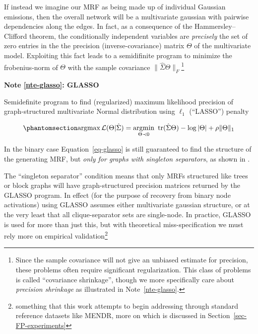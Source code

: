 \documentclass[%
	12pt,
		oneside,
		letterpaper
]{book}
\newcounter{quartocalloutnteno}
\newcommand{\quartocalloutnte}[1]{\refstepcounter{quartocalloutnteno}\label{#1}}
\begin{document}
If instead we imagine our MRF as being made up of individual Gaussian
emissions, then the overall network will be a multivariate gaussian with
pairwise dependencies along the edges. In fact, as a consequence of the
Hammersley--Clifford theorem, the conditionally independent variables
are \emph{precisely} the set of zero entries in the the precision
(inverse-covariance) matrix \(\Theta\) of the multivariate model.
Exploiting this fact leads to a semidifinite program to minimize the
frobenius-norm of \(\Theta\) with the sample covariance
\(\| \hat{\Sigma}\Theta \|_F\)\footnote{ Since the sample covariance
  will not give an unbiased estimate for precision, these problems often
  require significant regularization. This class of problems is called
  ``covariance shrinkage'', though we more specifically care about
  \emph{precision shrinkage} as illustrated in Note~\ref{nte-glasso}.}

\begin{tcolorbox}[enhanced jigsaw, colback=white, rightrule=.15mm, opacityback=0, colframe=quarto-callout-note-color-frame, bottomrule=.15mm, arc=.35mm, breakable, leftrule=.75mm, left=2mm, toprule=.15mm]

\quartocalloutnte{nte-glasso} 

\vspace{-3mm}\textbf{Note \ref*{nte-glasso}: GLASSO}\vspace{3mm}

Semidefinite program to find (regularized) maximum likelihood precision
of graph-structured multivariate Normal distribution using \(\ell_1\)
(``LASSO'') penalty \autocite{Sparseinversecovariance_Friedman2008}

\begin{equation}\phantomsection\label{eq-glasso}{
\operatorname*{argmax} \mathcal{L}(\Theta|\hat{\Sigma})
  = \operatorname*{argmin}_{\Theta \prec 0}\ \text{tr}(\hat{\Sigma} \Theta) - \log |\Theta|+ \rho\|\Theta\|_1
}\end{equation}

In the binary case Equation~\ref{eq-glasso} is still guaranteed to find
the structure of the generating MRF, but \emph{only for graphs with
singleton separators}, as shown in
\textcite{Structureestimationdiscrete_Loh2012}.

\end{tcolorbox}

The ``singleton separator'' condition means that only MRFs structured
like trees or block graphs will have graph-structured precision matrices
returned by the GLASSO program. In effect (for the purpose of recovery
from binary node activations) using GLASSO assumes either multivariate
gaussian structure, or at the very least that all clique-separator sets
are single-node. In practice, GLASSO is used for more than just this,
but with theoretical miss-specification we must rely more on empirical
validation\footnote{something that this work attempts to begin
  addressing through standard reference datasets like MENDR, more on
  which is discussed in Section~\ref{sec-FP-experiments}}
\end{document}
